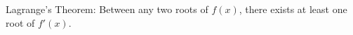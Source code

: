 \documentclass[preview]{standalone}
\begin{document}
\begin{center}
Lagrange's Theorem: Between any two roots of $f(x)$, there exists at least one root of $f'(x)$.
\end{center}
\end{document}
